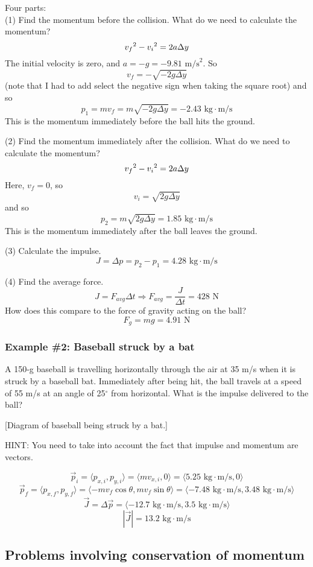 Four parts:\\
(1) Find the momentum before the collision. What do we need to calculate the momentum?
$$v_f\displaystyle^2-v_i\displaystyle^2=2a\Delta{y}$$
The initial velocity is zero, and $a=-g=-9.81\mbox{ m/s}^2$. So
$$v_f=-\sqrt{-2g\Delta{y}}$$
(note that I had to add select the negative sign when taking the square root) and so 
$$p_1=mv_f=m\sqrt{-2g\Delta{y}}=-2.43\mbox{ kg}\cdot\mbox{m/s}$$
This is the momentum immediately before the ball hits the ground.

(2) Find the momentum immediately after the collision. What do we need to calculate the momentum?
$$v_f\displaystyle^2-v_i\displaystyle^2=2a\Delta{y}$$
Here, $v_f=0$, so
$$v_i=\sqrt{2g\Delta{y}}$$
and so
$$p_2=m\sqrt{2g\Delta{y}}=1.85\mbox{ kg}\cdot\mbox{m/s}$$
This is the momentum immediately after the ball leaves the ground.

(3) Calculate the impulse.
$$J=\Delta{p}=p_2-p_1=4.28\mbox{ kg}\cdot\mbox{m/s}$$

(4) Find the average force.
$$J=F_{avg}\Delta{t}\Rightarrow F_{avg}=\frac{J}{\Delta{t}}=428\mbox{ N}$$
How does this compare to the force of gravity acting on the ball?
$$F_g=mg=4.91\mbox{ N}$$

\subsubsection*{Example \#2: Baseball struck by a bat}
A 150-g baseball is travelling horizontally through the air at 35 m/s when it is struck by a baseball bat. Immediately after being hit, the ball travels at a speed of 55 m/s at an angle of 25$^\circ$ from horizontal. What is the impulse delivered to the ball?

[Diagram of baseball being struck by a bat.]\nopagebreak
\vspace{4cm}

HINT: You need to take into account the fact that impulse and momentum are vectors.

$$\vec{p}_i=\langle{p_{x,i},p_{y,i}}\rangle=\langle{mv_{x,i},0}\rangle=\langle{5.25\mbox{ kg}\cdot\mbox{m/s},0}\rangle$$
$$\vec{p}_f=\langle{p_{x,f},p_{y,f}}\rangle=\langle{-mv_f\cos\theta,mv_f\sin\theta}\rangle=\langle{-7.48\mbox{ kg}\cdot\mbox{m/s},3.48\mbox{ kg}\cdot\mbox{m/s}}\rangle$$
$$\vec{J}=\Delta{\vec{p}}=\langle{-12.7\mbox{ kg}\cdot\mbox{m/s},3.5\mbox{ kg}\cdot\mbox{m/s}}\rangle$$
$$|\vec{J}|=13.2\mbox{ kg}\cdot\mbox{m/s}$$

\subsection{Problems involving conservation of momentum}
